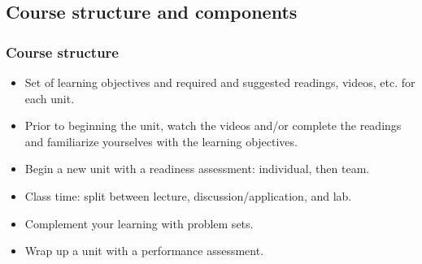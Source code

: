 \documentclass[11pt,containsverbatim,handout,xcolor=xelatex,dvipsnames,table]{beamer}
\begin{document}

\subsection{Course structure and components}


\begin{frame}
\frametitle{Course structure}

\begin{itemize}[<alert@+>]
\item Set of learning objectives and required and suggested readings, videos, etc. for 
each unit.
\item Prior to beginning the unit, watch the videos and/or complete the readings and 
familiarize yourselves with the learning objectives.
\item Begin a new unit with a readiness assessment: individual, then team.
\item Class time: split between lecture, discussion/application, and lab.
\item Complement your learning with problem sets.
\item Wrap up a unit with a performance assessment.
\end{itemize}


\end{frame}

\end{document}
